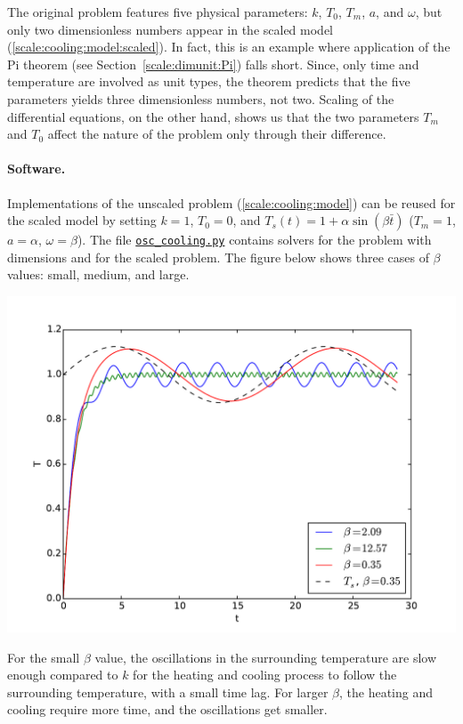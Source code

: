 \documentclass[graybox,envcountchap,sectrefs,final]{svmonodo}
\newenvironment{notice_mdfboxadmon}[1][]{
\begin{notice_mdfboxmdframed}[frametitle=#1]
}
{
\end{notice_mdfboxmdframed}
}
\begin{document}
\begin{notice_mdfboxadmon}[Remark]
The original problem features five physical parameters: $k$, $T_0$,
$T_m$, $a$, and $\omega$, but only two dimensionless numbers appear in the
scaled model (\ref{scale:cooling:model:scaled}).
In fact, this is an example where application of the Pi theorem
(see Section~\ref{scale:dimunit:Pi}) falls
short. Since, only time and temperature are involved as unit types, the
theorem predicts that the five parameters yields three dimensionless numbers,
not two. Scaling of the differential equations, on the other hand,
shows us that the two parameters
$T_m$ and $T_0$ affect the nature of the problem only through their difference.
\end{notice_mdfboxadmon}



\paragraph{Software.}
Implementations of the unscaled problem (\ref{scale:cooling:model})
can be reused for the scaled model by setting $k=1$, $T_0=0$, and
$T_s(t) = 1 + \alpha\sin (\beta \bar t)$ ($T_m=1$, $a=\alpha$, $\omega =\beta$).
The file \href{{http://tinyurl.com/o8pb3yy/osc_cooling.py}}{\nolinkurl{osc_cooling.py}} contains
solvers for the problem with dimensions and
for the scaled problem. The figure below
shows three cases of $\beta$ values: small, medium, and large.



\centerline{\includegraphics[width=0.8\linewidth]{fig-scaling/osc_cooling.pdf}}



For the small $\beta$ value, the oscillations in the surrounding
temperature are slow enough compared to $k$ for the heating and
cooling process to follow the surrounding temperature, with a small
time lag. For larger $\beta$, the heating and cooling require more
time, and the oscillations get smaller.
\end{document}

